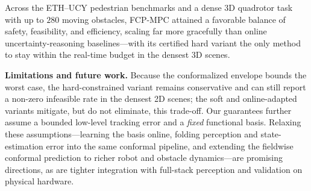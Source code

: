\documentclass[lettersize,journal]{IEEEtran}
\begin{document}
Across the ETH--UCY pedestrian benchmarks and a dense 3D quadrotor task with up to
$280$ moving obstacles, FCP-MPC attained a favorable balance of safety,
feasibility, and efficiency, scaling far more gracefully than online
uncertainty-reasoning baselines---with its certified hard variant the only method to
stay within the real-time budget in the densest 3D scenes.

\noindent
{\bf Limitations and future work.}
Because the conformalized envelope bounds the worst case, the hard-constrained variant
remains conservative and can still report a non-zero infeasible rate in the densest
2D scenes; the soft and online-adapted variants mitigate, but do not eliminate, this
trade-off. Our guarantees further assume a bounded low-level tracking error and a
\emph{fixed} functional basis. Relaxing these assumptions---learning the basis
online, folding perception and state-estimation error into the same conformal
pipeline, and extending the fieldwise conformal prediction to richer robot and obstacle
dynamics---are promising directions, as are tighter integration with full-stack
perception and validation on physical hardware.
\end{document}
